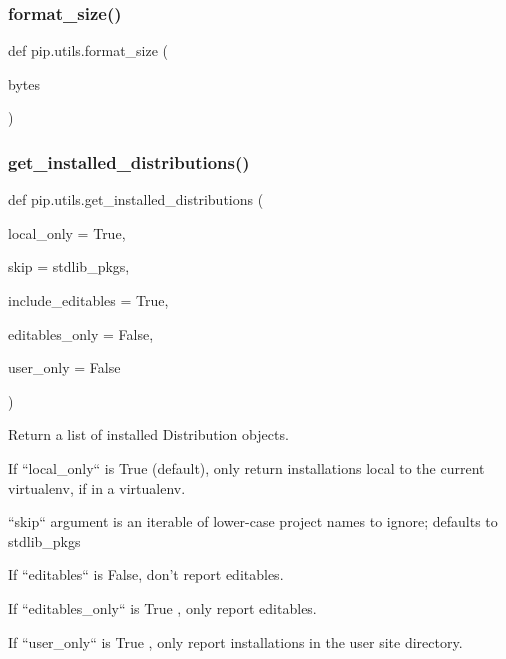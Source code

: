 \mbox{\label{namespacepip_1_1utils_a4700a41edc24b69d99c87cb670c2bff2}} 
\subsubsection{\texorpdfstring{format\+\_\+size()}{format\_size()}}
{\footnotesize\ttfamily def pip.\+utils.\+format\+\_\+size (\begin{DoxyParamCaption}\item[{}]{bytes }\end{DoxyParamCaption})}

\mbox{\label{namespacepip_1_1utils_a971c6731f6875ba85bc5a593e28736d2}} 
\subsubsection{\texorpdfstring{get\+\_\+installed\+\_\+distributions()}{get\_installed\_distributions()}}
{\footnotesize\ttfamily def pip.\+utils.\+get\+\_\+installed\+\_\+distributions (\begin{DoxyParamCaption}\item[{}]{local\+\_\+only = {\ttfamily True},  }\item[{}]{skip = {\ttfamily stdlib\+\_\+pkgs},  }\item[{}]{include\+\_\+editables = {\ttfamily True},  }\item[{}]{editables\+\_\+only = {\ttfamily False},  }\item[{}]{user\+\_\+only = {\ttfamily False} }\end{DoxyParamCaption})}

\begin{DoxyVerb}Return a list of installed Distribution objects.

If ``local_only`` is True (default), only return installations
local to the current virtualenv, if in a virtualenv.

``skip`` argument is an iterable of lower-case project names to
ignore; defaults to stdlib_pkgs

If ``editables`` is False, don't report editables.

If ``editables_only`` is True , only report editables.

If ``user_only`` is True , only report installations in the user
site directory.\end{DoxyVerb}
 \mbox{\label{namespacepip_1_1utils_a69bff732d934422c963eea9cbb411a9b}} 
